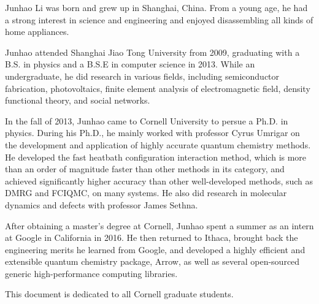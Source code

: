 \documentclass[phd,tocprelim]{cornell}
\begin{document}
\begin{biosketch}
Junhao Li was born and grew up in Shanghai, China.
From a young age, he had a strong interest in science and engineering and enjoyed disassembling all kinds of home appliances.

Junhao attended Shanghai Jiao Tong University from 2009, graduating with a B.S. in physics and a B.S.E in computer science in 2013.
While an undergraduate, he did research in various fields, including semiconductor fabrication, photovoltaics, finite element analysis of electromagnetic field, density functional theory, and social networks.

In the fall of 2013, Junhao came to Cornell University to persue a Ph.D. in physics.
During his Ph.D., he mainly worked with professor Cyrus Umrigar on the development and application of highly accurate quantum chemistry methods.
He developed the fast heatbath configuration interaction method, which is more than an order of magnitude faster than other methods in its category, and achieved significantly higher accuracy than other well-developed methods, such as DMRG and FCIQMC, on many systems.
He also did research in molecular dynamics and defects with professor James Sethna.

After obtaining a master's degree at Cornell, Junhao spent a summer as an intern at Google in California in 2016.
He then returned to Ithaca, brought back the engineering merits he learned from Google, and developed a highly efficient and extensible quantum chemistry package, Arrow, as well as several open-sourced generic high-performance computing libraries.
\end{biosketch}

\begin{dedication}
This document is dedicated to all Cornell graduate students.
\end{dedication}
\end{document}
